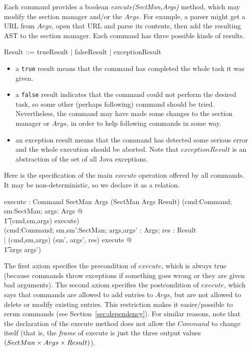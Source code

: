 \documentclass{llncs} %
\begin{document}
Each command provides a boolean \emph{execute(SectMan,Args)} method,
which may modify the section manager and/or the $Args$.
For example, a parser might get a URL from $Args$,
open that URL and parse its contents, then add 
the resulting AST to the section manager.  Each command
has three possible kinds of results.
\begin{zed}
  Result ::= trueResult | falseResult | exceptionResult
\end{zed}
\begin{itemize}
\item a \texttt{true} result means that the command has
  completed the whole task it was given.
\item a \texttt{false} result indicates that the command
  could not perform the desired task, so some other (perhaps following)
  command should be tried.  Nevertheless, the command may have
  made some changes to the section manager or $Args$, in order
  to help following commands in some way.
\item an exception result means that the command has detected
  some serious error and the whole execution should be aborted.
  Note that $exceptionResult$ is an abstraction of the set of all Java
  exceptions.
\end{itemize}

Here is the specification of the main \emph{execute} operation
offered by all commands.  It may be non-deterministic, so we declare
it as a relation. 

\begin{axdef}
  execute : Command \cross SectMan \cross Args 
       \rel (SectMan \cross Args \cross Result)
\where
  (\forall cmd:Command; sm:SectMan; args: Args @ \\
  \t1 (cmd,sm,args) \in \dom execute) \\
  (\forall cmd:Command; sm,sm':SectMan; args,args' : Args; res : Result\\
  | (cmd,sm,args) \mapsto (sm', args', res) \in execute @ \\
  \t1 args \subseteq args')
\end{axdef}

The first axiom specifies the precondition of $execute$, which is
always true (because commands throw exceptions if something goes wrong
or they are given bad arguments).  The second axiom specifies the
postcondition of $execute$, which says that commands are allowed to
add entries to $Args$, but are not allowed to delete or modify
existing entries.  This restriction makes it easier/possible to rerun
commands (see Section~\ref{sec:dependency}).  For similar reasons,
note that the declaration of the execute method does not allow the
$Command$ to change itself (that is, the \emph{frame} of execute is
just the three output values $(SectMan \cross Args \cross Result)$).
\end{document}
